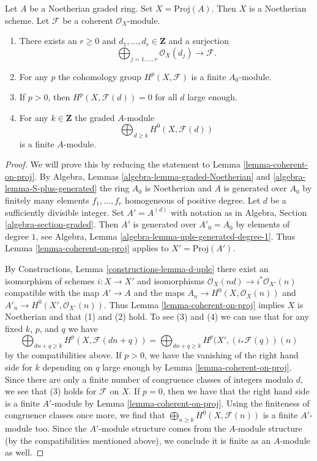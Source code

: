 \begin{lemma}
\label{lemma-coherent-on-proj-general}
Let $A$ be a Noetherian graded ring. Set $X = \text{Proj}(A)$. Then $X$
is a Noetherian scheme. Let $\mathcal{F}$ be a coherent $\mathcal{O}_X$-module.
\begin{enumerate}
\item There exists an $r \geq 0$ and
$d_1, \ldots, d_r \in \mathbf{Z}$ and a surjection
$$
\bigoplus\nolimits_{j = 1, \ldots, r} \mathcal{O}_X(d_j)
\longrightarrow \mathcal{F}.
$$
\item For any $p$ the cohomology group $H^p(X, \mathcal{F})$ is a finite
$A_0$-module.
\item If $p > 0$, then $H^p(X, \mathcal{F}(d)) = 0$ for all $d$ large enough.
\item For any $k \in \mathbf{Z}$ the graded $A$-module
$$
\bigoplus\nolimits_{d \geq k} H^0(X, \mathcal{F}(d))
$$
is a finite $A$-module.
\end{enumerate}
\end{lemma}

\begin{proof}
We will prove this by reducing the statement to
Lemma \ref{lemma-coherent-on-proj}.
By Algebra, Lemmas \ref{algebra-lemma-graded-Noetherian} and
\ref{algebra-lemma-S-plus-generated} the ring $A_0$ is Noetherian
and $A$ is generated over $A_0$ by finitely many elements
$f_1, \ldots, f_r$ homogeneous of positive degree.
Let $d$ be a sufficiently divisible integer. Set $A' = A^{(d)}$ with notation
as in Algebra, Section \ref{algebra-section-graded}.
Then $A'$ is generated over $A'_0 = A_0$ by elements of
degree $1$, see Algebra, Lemma \ref{algebra-lemma-uple-generated-degree-1}.
Thus Lemma \ref{lemma-coherent-on-proj} applies to $X' = \text{Proj}(A')$.

\medskip\noindent
By Constructions, Lemma \ref{constructions-lemma-d-uple} there exist
an isomorphism of schemes $i : X \to X'$ and
isomorphisms $\mathcal{O}_X(nd) \to i^*\mathcal{O}_{X'}(n)$
compatible with the map $A' \to A$ and the maps
$A_n \to H^0(X, \mathcal{O}_X(n))$ and $A'_n \to H^0(X', \mathcal{O}_{X'}(n))$.
Thus Lemma \ref{lemma-coherent-on-proj} implies $X$ is Noetherian and that
(1) and (2) hold. To see (3) and (4)
we can use that for any fixed $k$, $p$, and $q$ we have
$$
\bigoplus\nolimits_{dn + q \geq k} H^p(X, \mathcal{F}(dn + q)) =
\bigoplus\nolimits_{dn + q \geq k} H^p(X', (i_*\mathcal{F}(q))(n)
$$
by the compatibilities above. If $p > 0$, we have the vanishing of the right
hand side for $k$ depending on $q$ large enough by
Lemma \ref{lemma-coherent-on-proj}. Since there are only a finite number
of congruence classes of integers modulo $d$, we see that (3) holds for
$\mathcal{F}$ on $X$. If $p = 0$, then we have that the right hand side
is a finite $A'$-module by Lemma \ref{lemma-coherent-on-proj}. Using
the finiteness of congruence classes once more, we find that
$\bigoplus_{n \geq k} H^0(X, \mathcal{F}(n))$ is a finite $A'$-module too.
Since the $A'$-module structure comes from the $A$-module structure
(by the compatibilities mentioned above), we conclude it is finite
as an $A$-module as well.
\end{proof}

